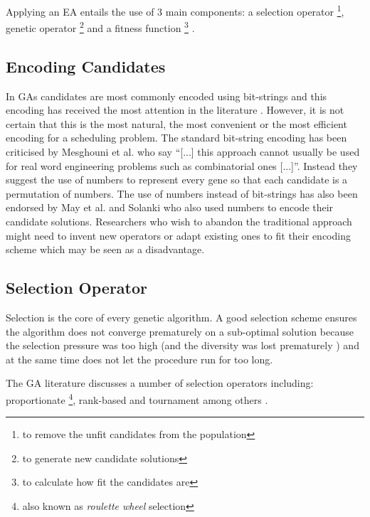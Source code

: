 \documentclass[a4paper, 12pt, titlepage]{article}
\begin{document}
Applying an EA entails the use of 3 main components: a selection
operator \footnote{to remove the unfit candidates from the population}, genetic operator \footnote{to generate new candidate solutions}
and a fitness function \footnote{to calculate how fit the candidates are}
\cite{mesghouni2004, yu2002, diveev2017, aljarrah2017, timilsina2015}.

\subsection*{Encoding Candidates}


In GAs candidates are most commonly encoded using bit-strings
\cite[p.~127]{norvig2010} and this encoding has received the most
attention in the literature \cite[p.~103]{eberhart2007}.
However, it is not certain that this is the most natural, the most
convenient or the most efficient encoding for a scheduling problem.
The standard bit-string encoding has been criticised by Mesghouni et al.
who say ``[...] this approach cannot usually be used for real word engineering problems such as combinatorial ones [...]''\cite[p.~93]{mesghouni2004}. Instead they suggest the use of numbers to represent every gene
so that each candidate is a permutation of numbers.
The use of numbers instead of bit-strings has also been endorsed by May et al.
and Solanki who also used numbers to encode their candidate solutions. \cite[p.~7076]{may2015} \cite[p.~3868]{solanki2015}
Researchers who wish to abandon the traditional approach might need to
invent new operators or adapt existing ones to fit their encoding scheme
which may be seen as a disadvantage.

\subsection*{Selection Operator}

Selection is the core of every genetic algorithm. A good selection scheme
ensures the algorithm does not converge prematurely on a sub-optimal
solution because the selection pressure was too high (and the diversity was
lost prematurely \cite[p.~23]{floreano2008}) and at the same
time does not let the procedure run for too long. \cite{yu2002}

The GA literature discusses a number of selection operators including:
proportionate \footnote{also known as \emph{roulette wheel} selection}, rank-based and
tournament among others \cite{floreano2008, eberhart2007, heaton2014}.
\end{document}
